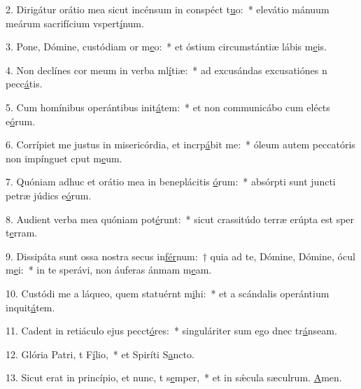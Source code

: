 2. Dirigátur orátio mea sicut incénsum in conspéct t\uline{u}o:~* elevátio mánuum meárum sacrifícium vspert\uline{í}num.\par 
3. Pone, Dómine, custódiam or m\uline{e}o:~* et óstium circumstántiæ lábis m\uline{e}is.\par 
4. Non declínes cor meum in verba ml\uline{í}tiæ:~* ad excusándas excusatiónes n pecc\uline{á}tis.\par 
5. Cum homínibus operántibus init\uline{á}tem:~* et non communicábo cum elécts e\uline{ó}rum.\par 
6. Corrípiet me justus in misericórdia, et incrp\uline{á}bit me:~* óleum autem peccatóris non impínguet cput m\uline{e}um.\par 
7. Quóniam adhuc et orátio mea in beneplácitis \uline{ó}rum:~* absórpti sunt juncti petræ júdics e\uline{ó}rum.\par 
8. Audient verba mea quóniam pot\uline{é}runt:~* sicut crassitúdo terræ erúpta est sper t\uline{e}rram.\par 
9. Dissipáta sunt ossa nostra secus in\uline{fér}num:~† quia ad te, Dómine, Dómine, ócul m\uline{e}i:~* in te sperávi, non áuferas ánmam m\uline{e}am.\par 
10. Custódi me a láqueo, quem statuérnt m\uline{i}hi:~* et a scándalis operántium inquit\uline{á}tem.\par 
11. Cadent in retiáculo ejus pecct\uline{ó}res:~* singuláriter sum ego dnec tr\uline{á}nseam.\par 
12. Glória Patri, t F\uline{í}lio,~* et Spiríti S\uline{a}ncto.\par 
13. Sicut erat in princípio, et nunc, t s\uline{e}mper,~* et in sǽcula sæculrum. \uline{A}men.\par 

